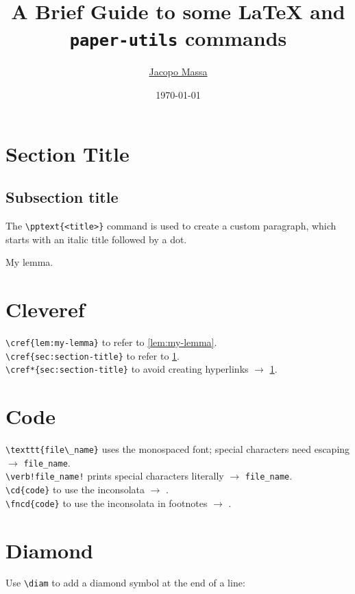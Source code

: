 \documentclass{article}
\title{A Brief Guide to some \LaTeX{} and \texttt{paper-utils} commands}
\author{\href{https://pages.di.unipi.it/massa}{Jacopo Massa}}
\date{\today}
\begin{document}
\section{Section Title}
\label{sec:section-title}

\subsection{Subsection title}
\label{sec:subsection-title}

 The \verb!\pptext{<title>}! command is used to create a custom paragraph, which starts with an italic title followed by a dot.

\begin{lemma}
	\label{lem:my-lemma}
	My lemma.
\end{lemma}

\section*{Cleveref}
\noindent
\verb!\cref{lem:my-lemma}! to refer to \cref{lem:my-lemma}.\\
\verb!\cref{sec:section-title}! to refer to \cref{sec:section-title}.\\
\verb!\cref*{sec:section-title}! to avoid creating hyperlinks $\longrightarrow$ \cref*{sec:section-title}.
\medskip

\section*{Code}

\verb|\texttt{file\_name}| uses the monospaced font; special characters need escaping $\longrightarrow$ \texttt{file\_name}.\\
\verb|\verb!file_name!| prints special characters literally $\longrightarrow$ \verb!file_name!.\\
\verb!\cd{code}! to use the inconsolata $\longrightarrow$ .\\
\verb!\fncd{code}! to use the inconsolata in footnotes $\longrightarrow$ .\\
\medskip

\section*{Diamond}

Use \verb!\diam! to add a diamond symbol at the end of a line:
\end{document}

